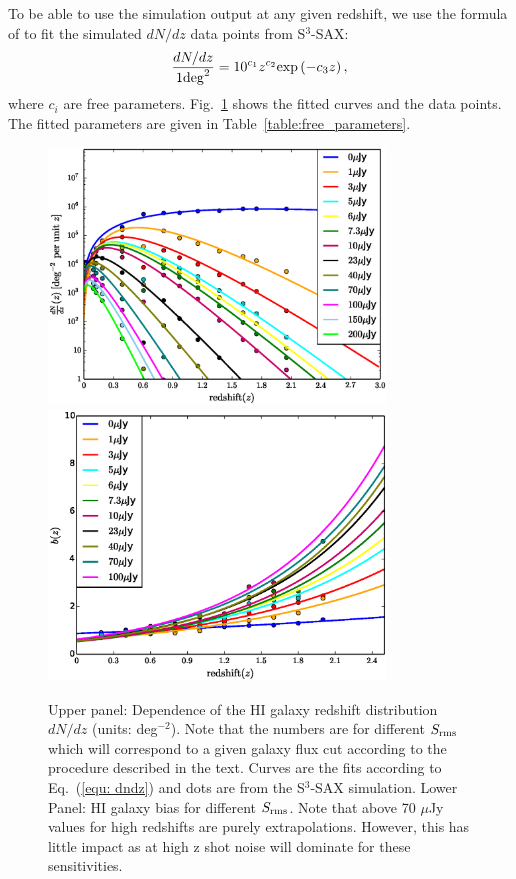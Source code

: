 \documentclass[useAMS,usenatbib]{mn2e}
\begin{document}
To be able to use the simulation output at any given redshift, we use the  formula of \cite{Obreschkow:2009ha} to fit the simulated $dN/dz$ data points from S$^3$-SAX:
  \begin{equation}
\frac{{ d}N/ {d}z}{{1 \rm deg}^2}= 10^{c_1} z^{c_2} {\rm exp}\left( - c_3 z\right), 
\label{equ: dndz}
\end{equation}
where $c_i$ are free parameters. Fig.~\ref{fig:dNOverdz_fit_sax3} shows the fitted curves and the data points. The fitted parameters are given in Table~\ref{table:free_parameters}.


\begin{figure}
\begin{center}
\includegraphics[width=0.8\textwidth]{plots/fittingMario_dNOverdz_using_ObreschkowFunc_diff_14bins_3.eps}
\includegraphics[width=0.8\textwidth]{plots/fitted_bias.eps}
\caption{Upper panel: Dependence of the HI galaxy redshift distribution $dN/dz$ (units: deg$^{-2}$). Note that the numbers are for different $S_{\rm{rms}}$ which will correspond to a given galaxy flux cut according to the procedure described in the text. Curves are the fits according to Eq.~(\ref{equ: dndz}) and dots are from the S$^3$-SAX simulation. Lower Panel: HI galaxy bias for different $S_{\rm{rms}}$. Note that above 70 $\mu$Jy values for high redshifts are purely extrapolations. However, this has little impact as at high z shot noise will dominate for these sensitivities.} 
\label{fig:dNOverdz_fit_sax3}
\end{center}
\end{figure}
\end{document}
